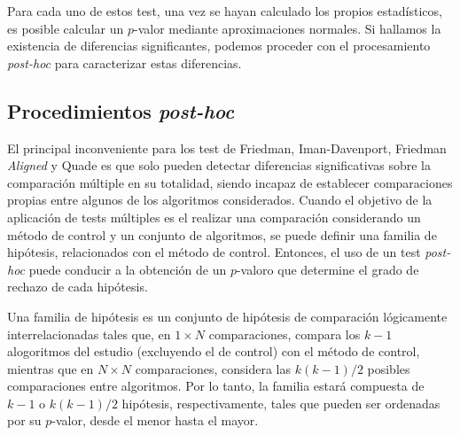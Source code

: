 Para cada uno de estos test, una vez se hayan calculado los propios estadísticos, es posible calcular un $p$-valor mediante aproximaciones normales. 
Si hallamos la existencia de diferencias significantes, podemos proceder con el procesamiento \textit{post-hoc} para caracterizar estas diferencias. 

\subsection{Procedimientos \textit{post-hoc}}

El principal inconveniente para los test de Friedman, Iman-Davenport, Friedman \textit{Aligned} y Quade es que solo pueden detectar diferencias significativas sobre la comparación múltiple en su totalidad, siendo incapaz de establecer comparaciones propias entre algunos de los algoritmos considerados. 
Cuando el objetivo de la aplicación de tests múltiples es el realizar una comparación considerando un método de control y un conjunto de algoritmos, se puede definir una familia de hipótesis, relacionados con el método de control. 
Entonces, el uso de un test \textit{post-hoc} puede conducir a la obtención de un $p$-valoro que determine el grado de rechazo de cada hipótesis. 

Una familia de hipótesis es un conjunto de hipótesis de comparación lógicamente interrelacionadas tales que, en $1\times N$ comparaciones, compara los $k-1$ alogoritmos del estudio (excluyendo el de control) con el método de control, mientras que en $N\times N$ comparaciones, considera las $k(k-1)/2$ posibles comparaciones entre algoritmos. 
Por lo tanto, la familia estará compuesta de $k-1$ o $k(k-1)/2$ hipótesis, respectivamente, tales que pueden ser ordenadas por su $p$-valor, desde el menor hasta el mayor. 

